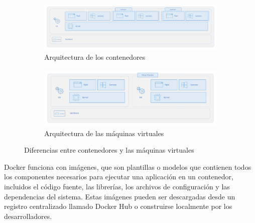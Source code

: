             \begin{figure}[h]
                \centering
                
                \begin{subfigure}[h]{\textwidth}
                    \includegraphics[width=\textwidth]{images/Diagramas/Esquema de Contenedores.png}
                    \caption{Arquitectura de los contenedores}
                    \label{fig:arquitectura-contenedores}
                \end{subfigure}
                
                \begin{subfigure}[h]{\textwidth}
                    \includegraphics[width=\textwidth]{images/Diagramas/Esquema de MVs.png}
                    \caption{Arquitectura de las máquinas virtuales}
                    \label{fig:arquitectura-maquinasvirtuales}
                \end{subfigure}
                
                \caption{Diferencias entre contenedores y las máquinas virtuales}
                \label{fig:contenedores-vs-maquinasvirtuales}
            \end{figure}
            
            Docker funciona con imágenes, que son plantillas o modelos que contienen todos los componentes necesarios para ejecutar una aplicación en un contenedor, incluidos el código fuente, las librerías, los archivos de configuración y las dependencias del sistema. Estas imágenes pueden ser descargadas desde un registro centralizado llamado Docker Hub \cite{docker-hub} o construirse localmente por los desarrolladores.
            
